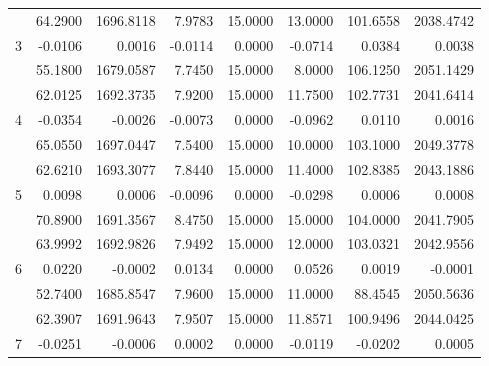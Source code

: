 \begin{table}[htb]
{\begin{tabular}{c|r|r|r|r|r|r|r}
 & 64.2900 & 1696.8118 & 7.9783 & 15.0000 & 13.0000 & 101.6558 & 2038.4742 \\ \cline{2-8} 
\multirow{-3}{*}{3} & \cellcolor[HTML]{ADDDAD}-0.0106 & \cellcolor[HTML]{ADDDAD}0.0016 & \cellcolor[HTML]{ADDDAD}-0.0114 & \cellcolor[HTML]{ADDDAD}0.0000 & -0.0714 & \cellcolor[HTML]{ADDDAD}0.0384 & \cellcolor[HTML]{ADDDAD}0.0038 \\ \hline
 & 55.1800 & 1679.0587 & 7.7450 & 15.0000 & 8.0000 & 106.1250 & 2051.1429 \\ \cline{2-8} 
 & 62.0125 & 1692.3735 & 7.9200 & 15.0000 & 11.7500 & 102.7731 & 2041.6414 \\ \cline{2-8} 
\multirow{-3}{*}{4} & \cellcolor[HTML]{ADDDAD}-0.0354 & \cellcolor[HTML]{ADDDAD}-0.0026 & \cellcolor[HTML]{ADDDAD}-0.0073 & \cellcolor[HTML]{ADDDAD}0.0000 & -0.0962 & \cellcolor[HTML]{ADDDAD}0.0110 & \cellcolor[HTML]{ADDDAD}0.0016 \\ \hline
 & 65.0550 & 1697.0447 & 7.5400 & 15.0000 & 10.0000 & 103.1000 & 2049.3778 \\ \cline{2-8} 
 & 62.6210 & 1693.3077 & 7.8440 & 15.0000 & 11.4000 & 102.8385 & 2043.1886 \\ \cline{2-8} 
\multirow{-3}{*}{5} & \cellcolor[HTML]{ADDDAD}0.0098 & \cellcolor[HTML]{ADDDAD}0.0006 & \cellcolor[HTML]{ADDDAD}-0.0096 & \cellcolor[HTML]{ADDDAD}0.0000 & \cellcolor[HTML]{ADDDAD}-0.0298 & \cellcolor[HTML]{ADDDAD}0.0006 & \cellcolor[HTML]{ADDDAD}0.0008 \\ \hline
 & 70.8900 & 1691.3567 & 8.4750 & 15.0000 & 15.0000 & 104.0000 & 2041.7905 \\ \cline{2-8} 
 & 63.9992 & 1692.9826 & 7.9492 & 15.0000 & 12.0000 & 103.0321 & 2042.9556 \\ \cline{2-8} 
\multirow{-3}{*}{6} & \cellcolor[HTML]{ADDDAD}0.0220 & \cellcolor[HTML]{ADDDAD}-0.0002 & \cellcolor[HTML]{ADDDAD}0.0134 & \cellcolor[HTML]{ADDDAD}0.0000 & 0.0526 & \cellcolor[HTML]{ADDDAD}0.0019 & \cellcolor[HTML]{ADDDAD}-0.0001 \\ \hline
 & 52.7400 & 1685.8547 & 7.9600 & 15.0000 & 11.0000 & 88.4545 & 2050.5636 \\ \cline{2-8} 
 & 62.3907 & 1691.9643 & 7.9507 & 15.0000 & 11.8571 & 100.9496 & 2044.0425 \\ \cline{2-8} 
\multirow{-3}{*}{7} & \cellcolor[HTML]{ADDDAD}-0.0251 & \cellcolor[HTML]{ADDDAD}-0.0006 & \cellcolor[HTML]{ADDDAD}0.0002 & \cellcolor[HTML]{ADDDAD}0.0000 & \cellcolor[HTML]{ADDDAD}-0.0119 & \cellcolor[HTML]{ADDDAD}-0.0202 & \cellcolor[HTML]{ADDDAD}0.0005 \\ \hline

\end{tabular}}
\end{table}
